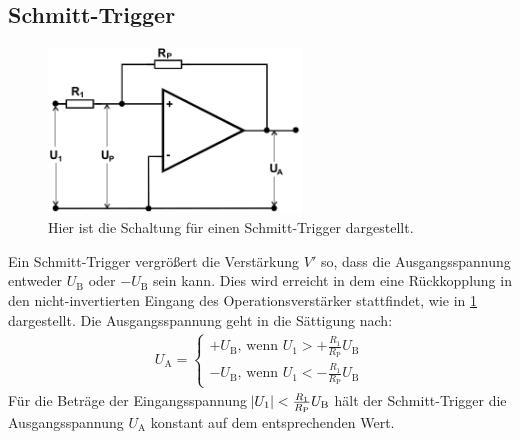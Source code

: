 \subsection{Schmitt-Trigger}
\label{sec:Schmitt}
\begin{figure}[h!]
	\centering
	\includegraphics[width = 0.6\textwidth]{../Grafiken/Schmitt-Trigger.png}
	\caption{Hier ist die Schaltung für einen Schmitt-Trigger dargestellt. \cite{V51}\label{fig:Schmitt-Trigger}}
\end{figure}
\noindent
Ein Schmitt-Trigger vergrößert die Verstärkung $V'$ so, dass die Ausgangsspannung entweder $U_\text{B}$ oder $-U_\text{B}$ sein kann.
Dies wird erreicht in dem eine Rückkopplung in den nicht-invertierten Eingang des Operationsverstärker stattfindet, wie in \cref{fig:Schmitt-Trigger} dargestellt.
Die Ausgangsspannung geht in die Sättigung nach:
\begin{align}
	U_\text{A}=
	\begin{cases}
		+U_\text{B}\text{, wenn } U_1 > +\frac{R_1}{R_\text{P}}U_\text{B} \\
		-U_\text{B}\text{, wenn } U_1 < -\frac{R_1}{R_\text{P}}U_\text{B}
	\end{cases}\label{eq:kippspannug}
\end{align}
Für die Beträge der Eingangsspannung $\abs{U_1} < \frac{R_1}{R_\text{P}}U_\text{B}$ hält der Schmitt-Trigger
die Ausgangsspannung $U_\text{A}$ konstant auf dem entsprechenden Wert. 

